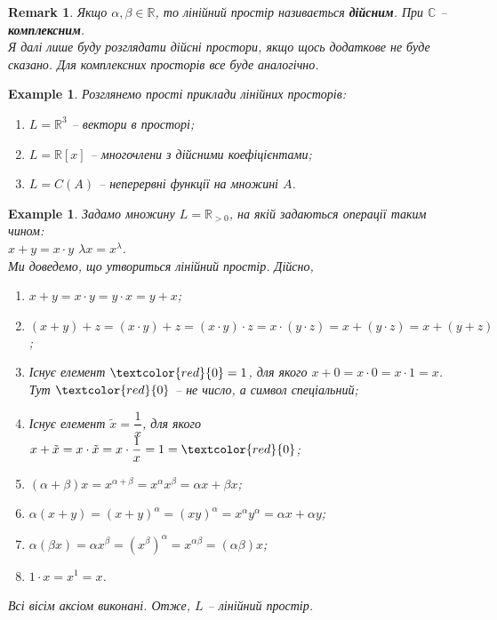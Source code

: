 \documentclass[a4paper, 10pt]{article}
\theoremstyle{theoremdd}
\newtheorem{example}[theorem]{Example}
\newtheorem{remark}[theorem]{Remark}
\begin{document}
	\begin{remark}
	Якщо $\alpha, \beta \in \mathbb{R}$, то лінійний простір називається  \textbf{дійсним}. При $\mathbb{C}$ -- \textbf{комплексним}.\\
	\textit{Я далі лише буду розглядати дійсні простори, якщо щось додаткове не буде сказано. Для комплексних просторів все буде аналогічно.}
	\end{remark}
	
	\iffalse
	\begin{remark}
	Да й взагалі-то кажучи, лінійний простір можна визначити на будь-якому полі $F$. Зокрема множини $\mathbb{R}, \mathbb{C}$ самі утворюють поле, але це вже просунута штука.
	\end{remark}
	\fi
	
	\begin{example}
	Розглянемо прості приклади лінійних просторів:
	\begin{enumerate}[nosep, wide=0pt, label={\arabic*)}]
	\item $L = \mathbb{R}^3$ -- вектори в просторі;
	\item $L = \mathbb{R}[x]$ -- многочлени з дійсними коефіцієнтами;
	\item $L = C(A)$ -- неперервні функції на множині $A$.
	\end{enumerate}
	\end{example}
	
	\begin{example}
	Задамо множину $L = \mathbb{R}_{> 0}$, на якій задаються операції таким чином:\\
	$x + y = x \cdot y$ \qquad $\lambda x = x^\lambda$.\\
	Ми доведемо, що утвориться лінійний простір. Дійсно,
	\begin{enumerate}[nosep, wide=0pt, label={\arabic*)}]
	\item $x+y = x \cdot y = y \cdot x = y + x$;
	\item $(x+y) + z = (x \cdot y) + z = (x \cdot y) \cdot z = x \cdot (y \cdot z) = x + (y \cdot z) = x + (y + z)$;
	\item Існує елемент $\textcolor{red}{0} = 1$, для якого $x + 0 = x \cdot 0 = x \cdot 1 = x$. Тут $\textcolor{red}{0}$ -- не число, а символ спеціальний;
	\item Існує елемент $\tilde{x} = \dfrac{1}{x}$, для якого $x + \tilde{x} = x \cdot \tilde{x} = x \cdot \dfrac{1}{x} = 1 = \textcolor{red}{0}$;
	\item $(\alpha + \beta)x = x^{\alpha + \beta} = x^{\alpha} x^{\beta} = \alpha x + \beta x$;
	\item $\alpha (x+y) = (x+y)^\alpha = (xy)^{\alpha} = x^{\alpha} y^{\alpha} = \alpha x + \alpha y$;
	\item $\alpha (\beta x) = \alpha x^\beta = (x^\beta)^\alpha = x^{\alpha \beta} = (\alpha \beta) x$;
	\item $1 \cdot x = x^1 = x$.
	\end{enumerate}
	Всі вісім аксіом виконані. Отже, $L$ -- лінійний простір.
	\end{example}
	
\end{document}

